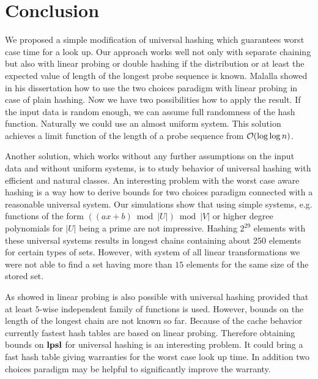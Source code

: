 \section{Conclusion}
\label{section-conclusion}
We proposed a simple modification of universal hashing which guarantees worst case time for a look up. Our approach works well not only with separate chaining but also with linear probing or double hashing if the distribution or at least the expected value of length of the longest probe sequence is known. Malalla showed in his dissertation \cite{Malalla:2004:THS:1124034} how to use the two choices paradigm with linear probing in case of plain hashing. Now we have two possibilities how to apply the result. If the input data is random enough, we can assume full randomness of the hash function. Naturally we could use an almost uniform system. This solution achieves a limit function of the length of a probe sequence from $\mathcal{O}(\log \log n)$.

Another solution, which works without any further assumptions on the input data and without uniform systems, is to study behavior of universal hashing with efficient and natural classes. An interesting problem with the worst case aware hashing is a way how to derive bounds for two choices paradigm connected with a reasonable universal system. Our simulations show that using simple systems, e.g. functions of the form $((ax + b) \bmod |U|) \bmod |V|$ or higher degree polynomials for $|U|$ being a prime are not impressive. Hashing $2^{29}$ elements with these universal systems results in longest chains containing about $250$ elements for certain types of sets. However, with system of all linear transformations we were not able to find a set having more than $15$ elements for the same size of the stored set.

As showed in \cite{DBLP:conf/alenex/ThorupZ10} linear probing is also possible with universal hashing provided that at least $5$-wise independent family of functions is used. However, bounds on the length of the longest chain are not known so far. Because of the cache behavior currently fastest hash tables are based on linear probing. Therefore obtaining bounds on $\mathbf{lpsl}$ for universal hashing is an interesting problem. It could bring a fast hash table giving warranties for the worst case look up time. In addition two choices paradigm may be helpful to significantly improve the warranty.